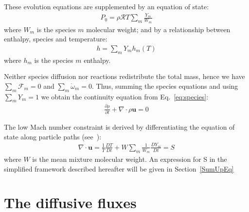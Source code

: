 These evolution equations are supplemented by an equation of state:
\begin{eqnarray}
P_0=\rho \mathcal{R} T \sum_m \frac{Y_m}{W_m}
\label{eq:eos}
\end{eqnarray}
where $W_m$ is the species $m$ molecular weight; and by a relationship between enthalpy, species and temperature:
\begin{eqnarray}
h=\sum_m Y_m h_m(T)
\end{eqnarray}
where $h_m$ is the species $m$ enthalpy. 

Neither species diffusion nor reactions redistribute the total mass, hence we have $\sum_m \boldsymbol{\mathcal{F}}_m = 0$ and $\sum_m \dot{\omega}_m = 0$. Thus, summing the species equations and using $\sum_m Y_m = 1$ we obtain the continuity equation from Eq.~\ref{eq:species}:
\begin{eqnarray}
\frac{\partial \rho}{\partial t} + \nabla \cdot \rho \boldsymbol{u} = 0
\end{eqnarray}

The low Mach number constraint is derived by differentiating the equation of state along particle paths (see~\cite{pember-flame}):
\begin{eqnarray}
\nabla \cdot \boldsymbol{u} = \frac{1}{T}\frac{DT}{Dt} + W \sum_m \frac{1}{W_m} \frac{DY_m}{Dt} = S
\label{eq:veloconstr}
\end{eqnarray}
where $W$ is the mean mixture molecular weight. An expression for S in the simplified framework described hereafter will be given in Section~\ref{SumUpEq}





\section{The diffusive fluxes}
\label{DifFluxesEGLIB}
